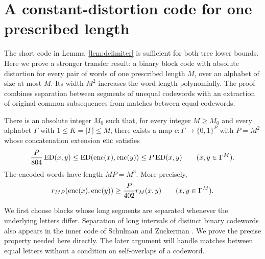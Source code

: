 \section{A constant-distortion code for one prescribed length}\label{sec:code}

The short code in Lemma~\ref{lem:delimiter} is sufficient for both
tree lower bounds. Here we prove a stronger transfer result: a binary
block code with absolute distortion for every pair of words of one
prescribed length $M$, over an alphabet of size at most $M$. Its width
$M^2$ increases the word length polynomially. The proof combines
separation between segments of unequal codewords with an extraction of
original common subsequences from matches between equal codewords.

\begin{theorem}\label{thm:804}
There is an absolute integer $M_0$ such that, for every integer
$M\geq M_0$ and every alphabet $\Gamma$ with $1\leq K=|\Gamma|\leq M$,
there exists a map $c:\Gamma\to\{0,1\}^{P}$ with $P=M^2$ whose
concatenation extension $\operatorname{enc}$ satisfies
\begin{equation}\label{eq:804}
 \frac P{804}\operatorname{ED}(x,y)
 \leq\operatorname{ED}(\operatorname{enc}(x),\operatorname{enc}(y))\leq P\operatorname{ED}(x,y)
 \qquad(x,y\in\Gamma^M).
\end{equation}
The encoded words have length $MP=M^3$. More precisely,
\begin{equation}\label{eq:402}
 r_{MP}(\operatorname{enc}(x),\operatorname{enc}(y))\geq\frac P{402}r_M(x,y)
 \qquad(x,y\in\Gamma^M).
\end{equation}
\end{theorem}

We first choose blocks whose long segments are separated whenever the
underlying letters differ. Separation of long intervals of distinct
binary codewords also appears in the inner code of Schulman and
Zuckerman \cite[Section~II-C, Condition~2 and Lemma~2]{SchulmanZuckerman1999}.
We prove the precise property needed here directly. The later argument
will handle matches between equal letters without a condition on
self-overlaps of a codeword.

